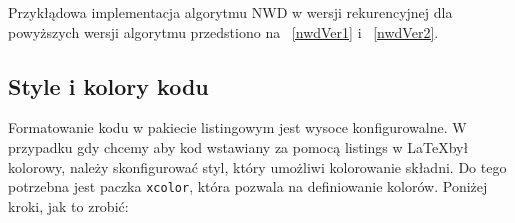 Przykłądowa implementacja algorytmu NWD w wersji rekurencyjnej dla powyższych wersji algorytmu przedstiono na \listingname~\ref{nwdVer1} i ~\ref{nwdVer2}.







\subsection{Style i kolory kodu}

Formatowanie kodu w pakiecie listingowym jest wysoce konfigurowalne. W przypadku gdy chcemy aby kod wstawiany za pomocą listings w \LaTeX był kolorowy, należy skonfigurować styl, który umożliwi kolorowanie składni. Do tego potrzebna jest paczka \texttt{xcolor}, która pozwala na definiowanie kolorów. Poniżej kroki, jak to zrobić:

